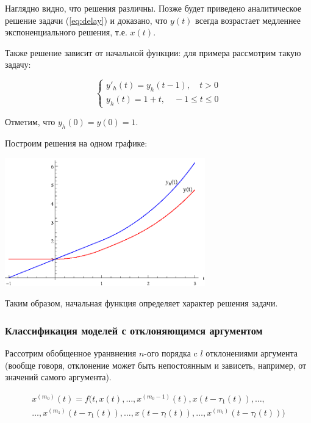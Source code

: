 Наглядно видно, что решения различны. Позже будет приведено аналитическое решение задачи (\ref{eq:delay}) и доказано, что $y(t)$ всегда возрастает медленнее экспоненциального решения, т.е. $x(t)$.

Также решение зависит от начальной функции: для примера рассмотрим такую задачу:

\begin{equation}\label{eq:no-delay-history}
\left\{
\begin{aligned}
y'_h(t) = y_h(t-1), \quad t>0\\
y_h(t) = 1+t, \quad -1 \leq t \leq 0
\end{aligned}
\right.
\end{equation}

Отметим, что $y_h(0) = y(0) = 1$.

Построим решения на одном графике:

\begin{center}
\includegraphics[width=0.65\textwidth]{./1_modelling/comparison_history.eps}
\end{center}

Таким образом, начальная функция определяет характер решения задачи.

\subsubsection{Классификация моделей с отклоняющимся аргументом}

Рассотрим обобщенное уранвнения $n$-ого порядка c $l$ отклонениями аргумента (вообще говоря, отклонение может быть непостоянным и зависеть, например, от значений самого аргумента).

\begin{equation}\label{eq:general-delay}
\begin{aligned}
x^{(m_0)}(t) = f(t,x(t),\dots,x^{(m_0-1)}(t),x(t-\tau_1(t)),\dots,\\\dots,x^{(m_1)}(t-\tau_1(t)),\dots,x(t-\tau_l(t)),\dots,x^{(m_l)}(t-\tau_l(t)))
\end{aligned}
\end{equation}

